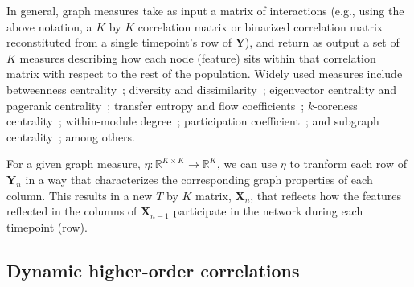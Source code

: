 \documentclass[english]{article}
\begin{document}
In general, graph measures take as input a matrix of
interactions (e.g., using the above notation, a $K$ by $K$
correlation matrix or binarized correlation matrix reconstituted from
a single timepoint's row of $\mathbf{Y}$), and return as output a set
of $K$ measures describing how each node (feature) sits within that
correlation matrix with respect to the rest of the population.  Widely
used measures include betweenness centrality~\citep[the proportion of
shortest paths between each pair of nodes in the population that
involves the given node in question; e.g.,][]{Newm05, OpsaEtal10,
  Bart04, GeisEtal08, Free77}; diversity and
dissimilarity~\citep[characterizations of how differently connected a
given node is from others in the population; e.g.,][]{Rao82, Lin09,
  RicoSzei06}; eigenvector centrality and pagerank
centrality~\citep[measures of how influential a given node is within
the broader network; e.g.,][]{Newm08, Bona07, LohmEtal10,
  HaluEtal13}; transfer entropy and flow coefficients~\citep[a measure
of how much information is flowing from a given node to other nodes in
the network; e.g.,][]{HoneEtal07, Schr00}; $k$-coreness
centrality~\citep[a measure of the connectivity of a node within its
local subgraph; e.g.,][]{AlvaEtal05, ChriFowl10}; within-module
degree~\citep[a measure of how many connections a node has to its
close neighbors in the network; e.g.,][]{RubiSpor10}; participation
coefficient~\citep[a measure of the diversity of a node's connections
to different subgraphs in the network; e.g.,][]{RubiSpor10}; and
subgraph centrality~\citep[a measure of a node's participation in all
of the network's subgraphs; e.g.,][]{EstrRodr05}; among others.

For a given graph measure,
$\eta: \mathbb{R}^{K \times K} \rightarrow \mathbb{R}^K$, we can use
$\eta$ to tranform each row of $\mathbf{Y}_n$ in a way that
characterizes the corresponding graph properties of each
column.  This results in a new $T$ by $K$ matrix, $\mathbf{X}_n$, that
reflects how the features reflected in the columns of $\mathbf{X}_{n-1}$
participate in the network during each timepoint (row).


\subsection*{Dynamic higher-order correlations}
\end{document}
